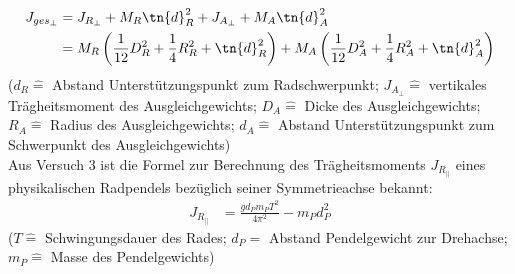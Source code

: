 \documentclass[12pt, a4paper, twoside]{scrartcl}
\begin{document}
\begin{align*}
 J_{ges_\perp} &= J_{R_{\perp}} + M_R \tn{ d}^2_R + J_{A_{\perp}} + M_A \tn{ d}^2_A  \\
 &= M_R \left( \frac{1}{12} D^2_R + \frac{1}{4} R^2_R + \tn{ d}^2_R \right) + M_A \left( \frac{1}{12} D^2_A + \frac{1}{4} R^2_A + \tn{ d}^2_A \right)
\end{align*}
($d_R \hat{=}$ Abstand Unterstützungspunkt zum Radschwerpunkt; $J_{A_{\perp}} \hat{=}$ vertikales Trägheitsmoment des Ausgleichgewichts; $D_A \hat{=}$ Dicke des Ausgleichgewichts; $R_A \hat{=}$ Radius des Ausgleichgewichts; $d_A \hat{=}$ Abstand Unterstützungspunkt zum Schwerpunkt des Ausgleichgewichts)\\
Aus Versuch 3 ist die Formel zur Berechnung des Trägheitsmoments $J_{R_{||}}$ eines physikalischen Radpendels bezüglich seiner Symmetrieachse bekannt:\\
\begin{align}
\label{eq:phypendel}
 J_{R_{||}} &= \frac{g d_P m_P T^2}{4 \pi^2} - m_P d^2_P
\end{align}
($T \hat{=}$ Schwingungsdauer des Rades; $d_P \hat{=}$ Abstand Pendelgewicht zur Drehachse; $m_P \hat{=}$ Masse des Pendelgewichts)\\
\end{document}
